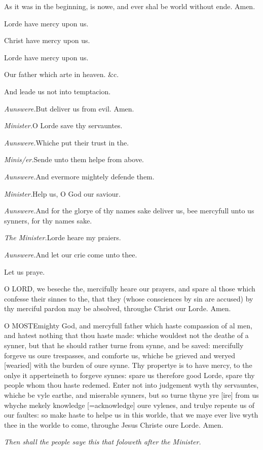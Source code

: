 As it was in the beginning, is nowe, and ever shal
be world without ende. Amen.

Lorde have mercy upon us.

Christ have mercy upon us.

Lorde have mercy upon us.

Our father which arte in heaven. \&c.

And leade us not into temptacion.

\emph{Aunswere.}But deliver us from evil. Amen.

\emph{Minister.}O Lorde save thy servauntes.

\emph{Aunswere.}Whiche put their trust in the.

\emph{Minis/er.}Sende unto them helpe from above.

\emph{Aunswere.}And evermore mightely defende them.

\emph{Minister.}Help us, O God our saviour.

\emph{Aunswere.}And for the glorye of thy names sake
deliver us, bee mercyfull unto us synners, for thy names sake.

\emph{The Minister.}Lorde heare my praiers.

\emph{Aunswere.}And let our crie come unto thee.

Let
us praye.

O
LORD, we beseche the, mercifully heare our prayers, and spare al those
which confesse their sinnes to the, that they (whose consciences by sin
are accused) by thy merciful pardon may be absolved, throughe Christ our
Lorde. Amen.

O
MOSTE\textbf{}mighty God, and mercyfull father which haste compassion of
al men, and hatest nothing that thou haste made: whiche wouldest not the
deathe of a synner, but that he should rather turne from synne, and be
saved: mercifully forgeve us oure trespasses, and comforte us, whiche
be grieved and weryed [wearied]
with the burden of oure synne. Thy propertye is to have mercy, to the
onlye it apperteineth to forgeve synnes: spare us therefore good Lorde,
spare thy people whom thou haste redemed. Enter not into judgement wyth
thy servauntes, whiche be vyle earthe, and miserable synners, but so turne
thyne yre [ire] from us whyche
mekely knowledge [=acknowledge] oure
vylenes, and trulye repente us of our faultes: so make haste to helpe
us in this worlde, that we maye ever live wyth thee in the worlde to come,
throughe Jesus Christe oure Lorde. Amen.

\emph{Then
shall the people saye this that foloweth after the Minister.}

